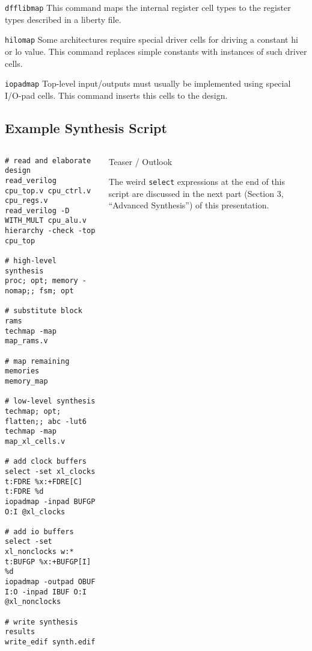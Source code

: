 \begin{frame}{\subsecname}
\begin{block}{\tt dfflibmap}
This command maps the internal register cell types to the register types
described in a liberty file.
\end{block}

\bigskip
\begin{block}{\tt hilomap}
Some architectures require special driver cells for driving a constant hi or lo
value. This command replaces simple constants with instances of such driver cells.
\end{block}

\bigskip
\begin{block}{\tt iopadmap}
Top-level input/outputs must usually be implemented using special I/O-pad cells.
This command inserts this cells to the design.
\end{block}
\end{frame}


\subsection{Example Synthesis Script}

\begin{frame}[fragile]{\subsecname}
\begin{columns}
\column[t]{4cm}
\begin{lstlisting}[basicstyle=\ttfamily\fontsize{6pt}{7pt}\selectfont, language=ys]
# read and elaborate design
read_verilog cpu_top.v cpu_ctrl.v cpu_regs.v
read_verilog -D WITH_MULT cpu_alu.v
hierarchy -check -top cpu_top

# high-level synthesis
proc; opt; memory -nomap;; fsm; opt

# substitute block rams
techmap -map map_rams.v

# map remaining memories
memory_map

# low-level synthesis
techmap; opt; flatten;; abc -lut6
techmap -map map_xl_cells.v

# add clock buffers
select -set xl_clocks t:FDRE %x:+FDRE[C] t:FDRE %d
iopadmap -inpad BUFGP O:I @xl_clocks

# add io buffers
select -set xl_nonclocks w:* t:BUFGP %x:+BUFGP[I] %d
iopadmap -outpad OBUF I:O -inpad IBUF O:I @xl_nonclocks

# write synthesis results
write_edif synth.edif
\end{lstlisting}
\column[t]{6cm}
\vskip1cm
\begin{block}{Teaser / Outlook}
\small\parbox{6cm}{
The weird {\tt select} expressions at the end of this script are discussed in
the next part (Section 3, ``Advanced Synthesis'') of this presentation.}
\end{block}
\end{columns}
\end{frame}

